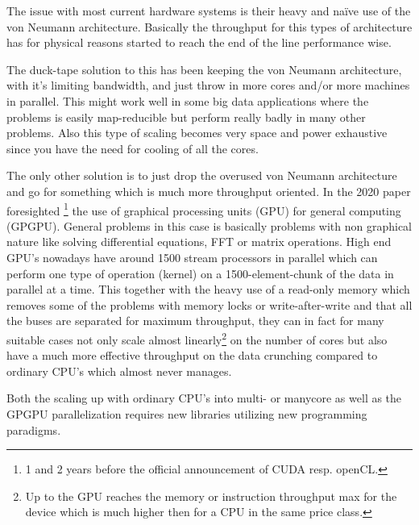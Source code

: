 \documentclass{article}
\begin{document}
    The issue with most current hardware systems is their heavy and 
    na\"{i}ve use of the von Neumann architecture. Basically the throughput 
    for this types of architecture has for physical reasons started to reach 
    the end of the line performance wise.

    The duck-tape solution to this has been keeping the von Neumann
    architecture, with it's limiting bandwidth, and just throw in more cores 
    and/or more machines in parallel. This might work well in some big data 
    applications where the problems is easily map-reducible but perform really 
    badly in many other problems.\cite{mapreduce} Also this type of scaling 
    becomes very space and power exhaustive since you have the need for
    cooling of all the cores. 

    The only other solution is to just drop the overused von Neumann 
    architecture and go for something which is much more throughput oriented. 
    In the 2020 paper\cite{ms2020} foresighted \footnote{1 and 2 years before 
    the official announcement of CUDA resp. openCL.} the use of graphical 
    processing units (GPU) for general computing (GPGPU). General problems in 
    this case is basically problems with non graphical nature like
    solving differential equations, FFT or matrix operations. 
    High end GPU's nowadays have around 1500 stream processors in parallel 
    which can perform one type of operation (kernel) on a 1500-element-chunk of 
    the data in parallel at a time. This together with the heavy use 
    of a read-only memory which removes some of the problems with memory locks
    or write-after-write and that all the buses are separated for
    maximum throughput, they can in fact for many suitable cases not only scale
    almost linearly\footnote{Up to the GPU reaches the memory or instruction
    throughput max for the device which is much higher then for a CPU in the
    same price class.} on the number of cores but also have a much more effective 
    throughput on the data crunching compared to ordinary CPU's which almost 
    never manages.

    Both the scaling up with ordinary CPU's into multi- or manycore as well as
    the GPGPU parallelization requires new libraries utilizing new programming paradigms.
\end{document}
